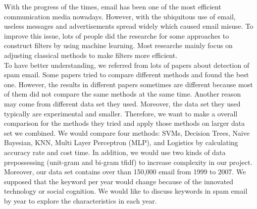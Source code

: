 
With the progress of the times, email has been one of the most efficient communication media nowadays. However, with the ubiquitous use of email, useless messages and advertisements spread widely which caused email misuse. To improve this issue, lots of people did the researche for some approaches to construct filters by using machine learning. Most researche mainly focus on adjusting classical methods to make filters more efficient.\\

To have better understanding, we referred from lots of papers about detection of spam email. Some papers tried to compare different methods and found the best one. However, the results in different papers sometimes are different because most of them did not compare the same methods at the same time. Another reason may come from different data set they used. Moreover, the data set they used typically are experimental and smaller. Therefore, we want to make a overall comparison for the methods they tried and apply those methods on larger data set we combined. We would compare four methods: SVMs, Decision Trees, Naive Bayesian, KNN, Multi Layer Perceptron (MLP), and Logistics by calculating accuracy rate and cost time. In addition, we would use two kinds of data prepossessing (unit-gram and bi-gram tfidf) to increase complexity in our project.\\

Moreover, our data set contains over than 150,000 email from 1999 to 2007. We supposed that the keyword per year would change because of the innovated technology or social cognition. We would like to discuss keywords in spam email by year to explore the characteristics in each year.


